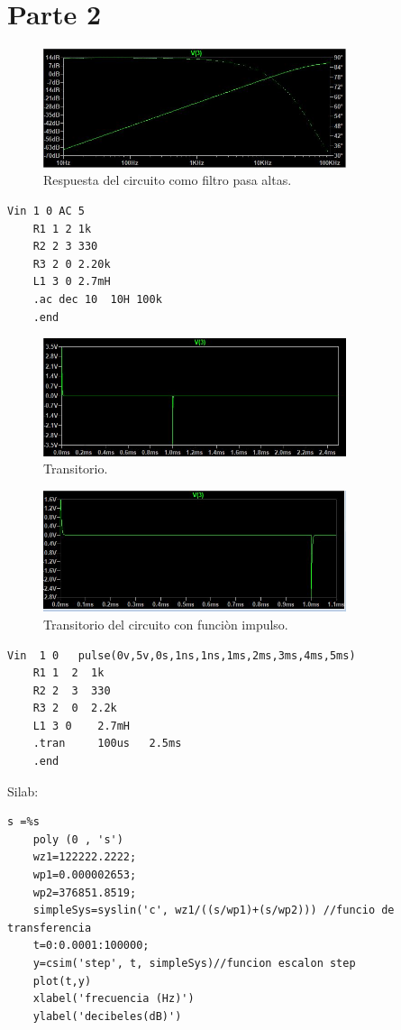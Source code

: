 \documentclass[12pt]{report}
\begin{document}
\section{Parte 2}
\begin{figure}[h!]
  \centering
    \includegraphics[width=3.5in]{ac}
  \caption{Respuesta del circuito como filtro pasa altas.}
\end{figure}
\begin{lstlisting}[frame=single]
    Vin 1 0 AC 5
    R1 1 2 1k
    R2 2 3 330
    R3 2 0 2.20k
    L1 3 0 2.7mH
    .ac dec 10  10H 100k
    .end

\end{lstlisting}
\begin{figure}[h!]
  \centering
    \includegraphics[width=3.5in]{pulse}
  \caption{Transitorio.}
\end{figure}
\begin{figure}[h!]
  \centering
    \includegraphics[width=3.5in]{pulse2}
  \caption{Transitorio del circuito con funciòn impulso.}
\end{figure}
\begin{lstlisting}[frame=single]
    Vin  1 0   pulse(0v,5v,0s,1ns,1ns,1ms,2ms,3ms,4ms,5ms) 
    R1 1  2  1k
    R2 2  3  330
    R3 2  0  2.2k
    L1 3 0    2.7mH
    .tran     100us   2.5ms
    .end
\end{lstlisting}
Silab:
\begin{lstlisting}[frame=single]
    s =%s
    poly (0 , 's')
    wz1=122222.2222;
    wp1=0.000002653;
    wp2=376851.8519;
    simpleSys=syslin('c', wz1/((s/wp1)+(s/wp2))) //funcio de        transferencia
    t=0:0.0001:100000;
    y=csim('step', t, simpleSys)//funcion escalon step
    plot(t,y)
    xlabel('frecuencia (Hz)')
    ylabel('decibeles(dB)')
\end{lstlisting}
\end{document}

